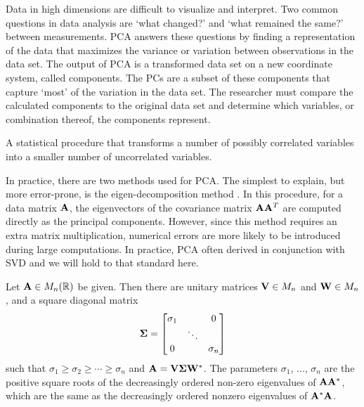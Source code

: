 Data in high dimensions are difficult to visualize and interpret.  Two common questions in data analysis are `what changed?' and `what
remained the same?' between measurements.  \gls{PCA} answers these questions by finding a representation of the data that maximizes
the \gls{variance} or variation between observations in the data set.  The output of \gls{PCA} is a transformed data set on a new coordinate
system, called components.  The \glspl{PC} are a subset of these components that capture `most' of the variation in the data set.  The researcher
must compare the calculated components to the original data set and determine which variables, or combination thereof, the components represent.

\begin{defn}
  A statistical procedure that transforms a number of possibly correlated variables into a smaller number of uncorrelated variables.
\end{defn}

In practice, there are two methods used for \gls{PCA}.  The simplest to explain, but more error-prone, is the eigen-decomposition
method \citep{smith2006}.  In this procedure, for a data matrix $\mathbf{A}$, the eigenvectors of the covariance matrix $\mathbf{A}\mathbf{A}^T$
are computed directly as the principal components.  However, since this method requires an extra matrix multiplication, numerical
errors are more likely to be introduced during large computations. In practice, \gls{PCA} often derived in conjunction with \gls{SVD}
and we will hold to that standard here.

\begin{thm}
  Let $\mathbf{A} \in M_{n}(\mathbb{R})$ be given. Then there are unitary matrices $\mathbf{V} \in M_n$ and $\mathbf{W} \in M_n$, and a square diagonal
  matrix
  \[
    \mathbf{\Sigma} =
      \begin{bmatrix}
        \sigma_1 &        & 0        \\
                 & \ddots &          \\
        0        &        & \sigma_n \\
      \end{bmatrix}
  \]
  such that $\sigma_1 \geq \sigma_2 \geq \cdots \geq \sigma_n$ and $\mathbf{A} = \mathbf{V}\mathbf{\Sigma}\mathbf{W}^*$.  The parameters $\sigma_1$,
  $\hdots$, $\sigma_n$ are the positive square roots of the decreasingly ordered non-zero eigenvalues of $\mathbf{A}\mathbf{A}^*$, which are the
  same as the decreasingly ordered nonzero eigenvalues of $\mathbf{A}^*\mathbf{A}$.
\end{thm}

